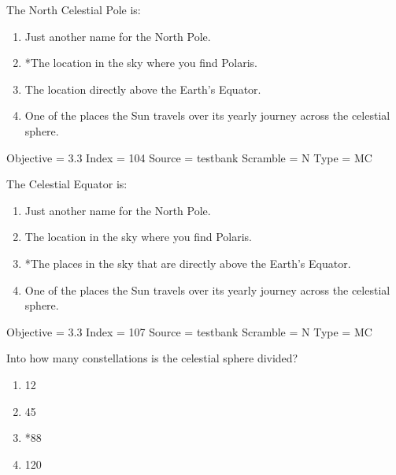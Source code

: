 \documentclass[11pt]{article}
\begin{document}
\begin{enumerate}
\begin{minipage}{\textwidth}
\begin{minipage}{\textwidth}
\item The North Celestial Pole is:
\begin{enumerate} 
\setlength{\itemsep}{1pt} 
\setlength{\parskip}{0pt} 
\setlength{\parsep}{0pt}
\setlength{\multicolsep}{1pt} 
\item Just another name for the North Pole.
\item *The location in the sky where you find Polaris.
\item The location directly above the Earth's Equator.
\item One of the places the Sun travels over its yearly journey across the celestial sphere.
\end{enumerate} 
Objective = 3.3
Index = 104
Source = testbank
Scramble = N
Type = MC
\end{minipage}
\end{minipage}
\vskip 0.20in

\begin{minipage}{\textwidth}
\begin{minipage}{\textwidth}
\item The  Celestial Equator is:
\begin{enumerate} 
\setlength{\itemsep}{1pt} 
\setlength{\parskip}{0pt} 
\setlength{\parsep}{0pt}
\setlength{\multicolsep}{1pt} 
\item Just another name for the North Pole.
\item The location in the sky where you find Polaris.
\item *The places in the sky that are  directly above the Earth's Equator.
\item One of the places the Sun travels over its yearly journey across the celestial sphere.
\end{enumerate} 
Objective = 3.3
Index = 107
Source = testbank
Scramble = N
Type = MC
\end{minipage}
\end{minipage}
\vskip 0.20in

\begin{minipage}{\textwidth}
\begin{minipage}{\textwidth}
\item Into how many constellations is the celestial sphere divided?
\begin{multicols}{3}
\begin{enumerate} 
\setlength{\itemsep}{1pt} 
\setlength{\parskip}{0pt} 
\setlength{\parsep}{0pt}
\setlength{\multicolsep}{1pt} 
\item 12
\item 45
\item *88
\item 120
\end{enumerate} 
\vfill 
\end{multicols}


\end{minipage}
\end{minipage}
\end{enumerate}
\end{document}
